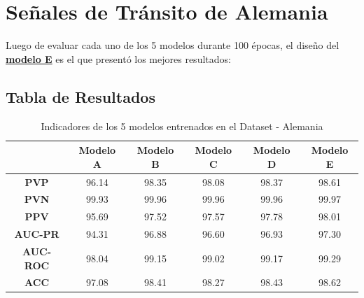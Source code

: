 		
	\section{Señales de Tránsito de Alemania}
		Luego de evaluar cada uno de los 5 modelos durante 100 épocas, el diseño del \underline{\bf modelo E} es el que presentó los mejores resultados:

		\subsection{Tabla de Resultados}


		\begin{table}[H]
			\begin{center}
			\caption{\small{Indicadores de los 5 modelos entrenados en el Dataset - Alemania}}
			\vspace{1.1em}
			\begin{tabular}{c|c|c|c|c|c|}
			\cline{2-6}
			                                 & \textbf{Modelo A} & \textbf{Modelo B} & \textbf{Modelo C} &\textbf{ Modelo D} & \textbf{Modelo E} \\ \hline
			\multicolumn{1}{|c|}{\textbf{PVP}}        & 96.14     & 98.35       & 98.08       & 98.37       & 98.61       \\ \hline
			\multicolumn{1}{|c|}{\textbf{PVN}}        & 99.93     & 99.96       & 99.96       & 99.96       & 99.97       \\ \hline
			\multicolumn{1}{|c|}{\textbf{PPV}}        & 95.69     & 97.52       & 97.57       & 97.78       & 98.01      \\ \hline
			\multicolumn{1}{|c|}{\textbf{AUC-PR}}     & 94.31     & 96.88       & 96.60       & 96.93       & 97.30       \\ \hline
			\multicolumn{1}{|c|}{\textbf{AUC-ROC}}    & 98.04     & 99.15       & 99.02       & 99.17       & 99.29       \\ \hline
			\multicolumn{1}{|c|}{\textbf{ACC}}        & 97.08     & 98.41       & 98.27       & 98.43       & 98.62       \\ \hline
			\end{tabular}
			\end{center}
		\end{table}

